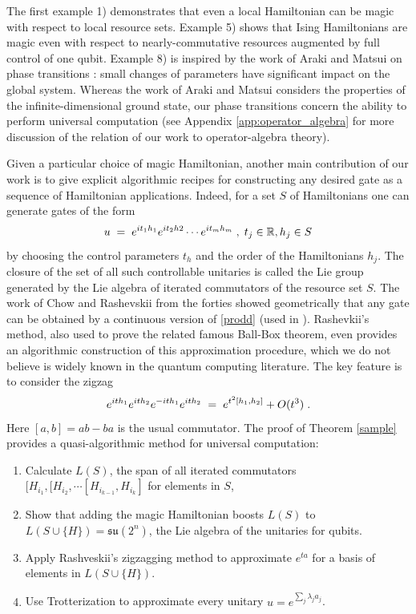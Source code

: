 \documentclass[12pt, a4-paper]{amsart}
\numberwithin{equation}{section}
\newcommand{\lel}{\pl = \pl}
\newcommand{\rz}{{\mathbb R}}
\newcommand{\pl}{\hspace{.1cm}}
\newcommand{\la}{\lambda}
\begin{document}
The first example 1) demonstrates that even a local Hamiltonian can be magic with respect to local resource sets. Example 5) shows that Ising Hamiltonians are magic even with respect to nearly-commutative resources augmented by full control of one qubit. Example 8) is inspired by the work of Araki and Matsui on phase transitions \cite{AM}: small changes of parameters have significant impact on the global system. Whereas the work of Araki and Matsui considers the properties of the infinite-dimensional ground state, our phase transitions concern the ability to perform universal computation (see Appendix \ref{app:operator_algebra} for more discussion of the relation of our work to operator-algebra theory). 
    

Given a particular choice of magic Hamiltonian, another main contribution of our work is to give explicit algorithmic recipes for constructing any desired gate as a sequence of Hamiltonian applications. Indeed, for a set $S$ of Hamiltonians one can generate gates of the form  
 \begin{equation}\label{prodd} 
 u\lel e^{it_1h_1}e^{it_2h2}\cdots e^{it_mh_m} \pl ,\pl t_j\in \rz, h_j\in S
 \end{equation}  
by choosing the control parameters $t_h$ and the order of the Hamiltonians $h_j$. The closure of the set of all such controllable unitaries is called the Lie group generated by the Lie algebra of iterated commutators of the resource set $S$. The work of Chow \cite{chow1940systeme} and Rashevskii \cite{rashevsky1938connecting} 
from the forties showed geometrically that any gate can be obtained by a continuous version of \eqref{prodd} (used in \cite {hu}). Rashevkii's method, also used to prove the related famous Ball-Box theorem, even provides an algorithmic construction of this approximation procedure, which we do not believe is widely known in the quantum computing literature. The key feature is to consider the zigzag
 \[ e^{ith_1}e^{ith_2}e^{-ith_1}e^{ith_2}\lel e^{t^2[h_1,h_2]}+O(t^3) \pl .\]
Here $[a,b]=ab-ba$ is the usual commutator. The proof of Theorem \eqref{sample} provides a quasi-algorithmic method for universal computation:  
 \begin{enumerate}
 \item[1)] Calculate $L(S)$, the span of all iterated commutators $[H_{i_1},[H_{i_2},\cdots [H_{i_{k-1}},H_{i_k}]$ for elements in $S$,
  \item[2)] Show that adding the magic Hamiltonian boosts $L(S)$ to $L(S\cup \{H\})=\mathfrak{su}(2^n)$, the Lie algebra of the unitaries for qubits.
  \item[3)] Apply Rashveskii's zigzagging method to approximate $e^{ta}$ for a basis of elements in $L(S\cup\{H\})$.
  \item[4)] Use Trotterization to approximate every unitary $u=e^{\sum_j \la_j a_j}$.
   \end{enumerate}
   
\end{document}
